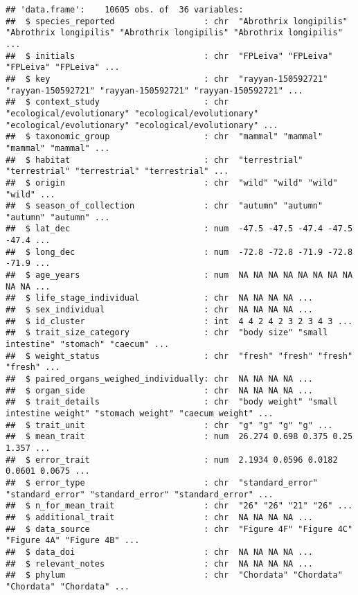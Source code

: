 \documentclass[
]{article}
\begin{document}
\begin{verbatim}
## 'data.frame':    10605 obs. of  36 variables:
##  $ species_reported                  : chr  "Abrothrix longipilis" "Abrothrix longipilis" "Abrothrix longipilis" "Abrothrix longipilis" ...
##  $ initials                          : chr  "FPLeiva" "FPLeiva" "FPLeiva" "FPLeiva" ...
##  $ key                               : chr  "rayyan-150592721" "rayyan-150592721" "rayyan-150592721" "rayyan-150592721" ...
##  $ context_study                     : chr  "ecological/evolutionary" "ecological/evolutionary" "ecological/evolutionary" "ecological/evolutionary" ...
##  $ taxonomic_group                   : chr  "mammal" "mammal" "mammal" "mammal" ...
##  $ habitat                           : chr  "terrestrial" "terrestrial" "terrestrial" "terrestrial" ...
##  $ origin                            : chr  "wild" "wild" "wild" "wild" ...
##  $ season_of_collection              : chr  "autumn" "autumn" "autumn" "autumn" ...
##  $ lat_dec                           : num  -47.5 -47.5 -47.4 -47.5 -47.4 ...
##  $ long_dec                          : num  -72.8 -72.8 -71.9 -72.8 -71.9 ...
##  $ age_years                         : num  NA NA NA NA NA NA NA NA NA NA ...
##  $ life_stage_individual             : chr  NA NA NA NA ...
##  $ sex_individual                    : chr  NA NA NA NA ...
##  $ id_cluster                        : int  4 4 2 4 2 3 2 3 4 3 ...
##  $ trait_size_category               : chr  "body size" "small intestine" "stomach" "caecum" ...
##  $ weight_status                     : chr  "fresh" "fresh" "fresh" "fresh" ...
##  $ paired_organs_weighed_individually: chr  NA NA NA NA ...
##  $ organ_side                        : chr  NA NA NA NA ...
##  $ trait_details                     : chr  "body weight" "small intestine weight" "stomach weight" "caecum weight" ...
##  $ trait_unit                        : chr  "g" "g" "g" "g" ...
##  $ mean_trait                        : num  26.274 0.698 0.375 0.25 1.357 ...
##  $ error_trait                       : num  2.1934 0.0596 0.0182 0.0601 0.0675 ...
##  $ error_type                        : chr  "standard_error" "standard_error" "standard_error" "standard_error" ...
##  $ n_for_mean_trait                  : chr  "26" "26" "21" "26" ...
##  $ additional_trait                  : chr  NA NA NA NA ...
##  $ data_source                       : chr  "Figure 4F" "Figure 4C" "Figure 4A" "Figure 4B" ...
##  $ data_doi                          : chr  NA NA NA NA ...
##  $ relevant_notes                    : chr  NA NA NA NA ...
##  $ phylum                            : chr  "Chordata" "Chordata" "Chordata" "Chordata" ...

\end{verbatim}
\end{document}
